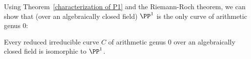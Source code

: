 %
%
%
%
%

Using Theorem~\ref{characterization of P1} and the Riemann-Roch theorem, we can show that (over an algebraically closed field) $\PP^1$
is the only curve of arithmetic genus 0:

\begin{corollary}
 Every reduced irreducible curve $C$ of arithmetic genus 0 over an algebraically closed field is isomorphic to $\PP^1$.
 \end{corollary}

